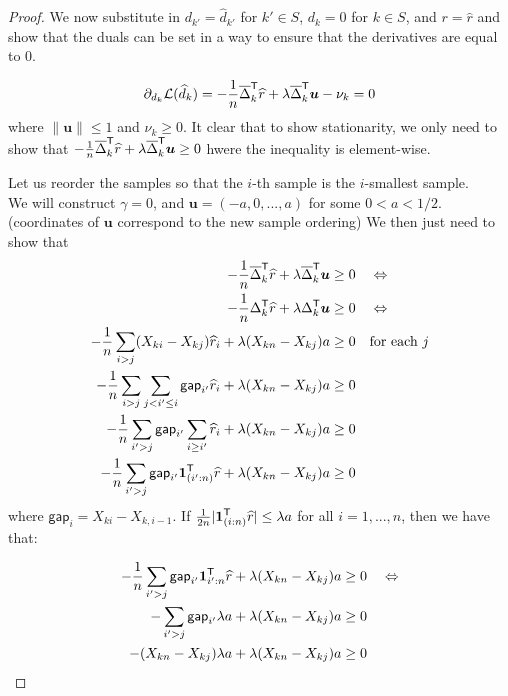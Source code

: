 \begin{proof}
We now substitute in $d_{k'} = \hat{d}_{k'}$ for $k' \in S$, $d_k = 0$ for $k \in S$, and $r = \hat{r}$ and show that the duals can be set in a way to ensure that the derivatives are equal to 0.

\begin{align*}
\partial_{d_k} \mathcal{L}(\widehat{d}_k) = -\frac{1}{n} \overline{\Delta}_k^{\mathsf{T}}\widehat{r} + \lambda \overline{\Delta}_k^{\mathsf{T}} \mbox{\boldmath $u$}
           - \nu_k = 0 
\end{align*}
where $\| \mathbf{u} \| \leq 1$ and $\nu_k \geq 0$. It clear that to show stationarity, we only need to show that $-\frac{1}{n} \overline{\Delta}_k^{\mathsf{T}} \widehat{r} + \lambda \overline{\Delta}_k^{\mathsf{T}} \mbox{\boldmath $u$} \geq 0$ hwere the inequality is element-wise.

Let us reorder the samples so that the $i$-th sample is the $i$-smallest sample. \\

We will construct $\gamma = 0$, and $\mathbf{u} = (-a, 0, ..., a)$ for some $0 < a < 1/2$. (coordinates of $\mathbf{u}$ correspond to the new sample ordering) We then just need to show that
\begin{align*}
- \frac{1}{n} \overline{\Delta}_k^{\mathsf{T}} \widehat{r} + \lambda \overline{\Delta}_k^{\mathsf{T}} \mbox{\boldmath $u$} &\geq 0 \quad \Leftrightarrow \\
- \frac{1}{n} \Delta_k^{\mathsf{T}} \widehat{r} + \lambda \Delta_k^{\mathsf{T}} \mbox{\boldmath $u$} &\geq 0 \quad \Leftrightarrow\\
- \frac{1}{n} \sum_{i > j} (X_{ki} - X_{kj}) \widehat{r}_i + \lambda (X_{kn} - X_{kj})a &\geq 0 \quad 
   \textrm{for each } j \\
- \frac{1}{n} \sum_{i > j} \sum_{j < i' \leq i} \mathsf{gap}_{i'} \widehat{r}_i 
    + \lambda (X_{kn} - X_{kj})a &\geq 0 \\
- \frac{1}{n} \sum_{i' > j} \mathsf{gap}_{i'} \sum_{i \geq i'} \widehat{r}_i 
    + \lambda (X_{kn} - X_{kj})a &\geq 0 \\
- \frac{1}{n} \sum_{i' > j} \mathsf{gap}_{i'} \mbox{\boldmath $1$}_{(i':n)}^{\mathsf{T}} \widehat{r} 
   + \lambda (X_{kn} - X_{kj})a &\geq 0 
\end{align*}
where $\mathsf{gap}_i = X_{ki} - X_{k,i-1}$. If $\frac{1}{2n} |\mbox{\boldmath $1$}_{(i:n)}^{\mathsf{T}} \widehat{r}| \leq \lambda a$ for all $i=1,...,n$, then we have that:

\begin{align*}
- \frac{1}{n} \sum_{i' > j} \mathsf{gap}_{i'} \mbox{\boldmath $1$}_{i':n}^{\mathsf{T}} \widehat{r}
   + \lambda (X_{kn} - X_{kj})a &\geq 0 \quad \Leftrightarrow \\
- \sum_{i' > j} \mathsf{gap}_{i'} \lambda a + \lambda (X_{kn} - X_{kj}) a &\geq 0\\
- (X_{kn} - X_{kj}) \lambda a + \lambda (X_{kn} - X_{kj}) a &\geq 0
\end{align*}


\end{proof}
